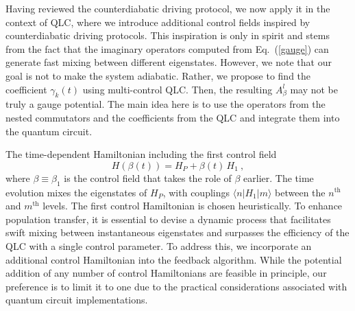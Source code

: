 \documentclass[twocolumn,aps,superscriptaddress,floatfix,longbibliography]{revtex4-2}
\newcommand{\raj}[1]{{\color[rgb]{1,0,1}{#1}}}
\begin{document}

Having reviewed the counterdiabatic driving protocol, we now apply it in the context of QLC, where we introduce additional control fields inspired by counterdiabatic driving protocols.  This inspiration is only in spirit and stems from the fact that the imaginary operators computed from Eq.~(\ref{gauge}) can generate fast mixing between different eigenstates. However, we note that our goal is not to make the system adiabatic. Rather, we propose to find the coefficient $\gamma_{k}(t)$ using multi-control QLC. Then, the resulting $A_{\beta}^{l}$ may not be truly a gauge potential. The main idea here is to use the operators from the nested commutators and the coefficients from the QLC and integrate them into the quantum circuit. 


The time-dependent Hamiltonian including the first control field 
\begin{equation}
   H(\beta(t)) %
   = H_P+\beta(t) \,H_1 \ ,
\label{Ham-one}
\end{equation}
where $\beta \equiv \beta_1$ is the control field
that takes the role of $\beta$ earlier. The time evolution mixes the eigenstates of $H_P$, with couplings $\langle n|H_1|m\rangle$ between the $n^{\text{th}}$ and $m^{\text{th}}$ levels. The first control Hamiltonian is chosen heuristically. To enhance population transfer, it is essential to devise a dynamic process that facilitates swift mixing between
instantaneous eigenstates and surpasses %
the efficiency of the QLC
with a single control parameter. To address this, we incorporate
an additional control Hamiltonian into the feedback algorithm.
While the potential addition of any number of control
Hamiltonians are feasible in principle, our preference is to
limit it to one due to the practical considerations associated
with quantum circuit implementations. 
\end{document}
